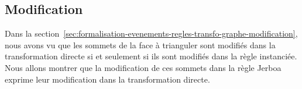 



\subsection{Modification}

Dans la section~\ref{sec:formalisation-evenements-regles-transfo-graphe-modification}, nous avons vu que les sommets de la face à trianguler sont modifiés dans la transformation directe si et seulement si ils sont modifiés dans la règle instanciée. %
Nous allons montrer que la modification de ces sommets dans la règle Jerboa
exprime leur modification dans la transformation directe. %

